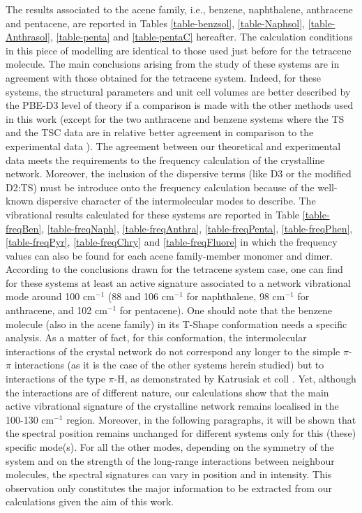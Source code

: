 The results associated to the acene family, i.e., benzene, naphthalene, anthracene and pentacene, are reported in Tables \ref{table-benzsol}, \ref{table-Naphsol}, \ref{table-Anthrasol}, \ref{table-penta} and \ref{table-pentaC} hereafter. The calculation conditions in this piece of modelling are identical to those used just before for the tetracene molecule. The main conclusions arising from the study of these systems are in agreement with those obtained for the tetracene system. Indeed, for these systems, the structural parameters and unit cell volumes are better described by the PBE-D3 level of theory if a comparison is made with the other methods used in this work (except for the two anthracene and benzene systems where the TS and the TSC data are in relative better agreement in comparison to the experimental data \cite{buvcko2013tkatchenko}). The agreement between our theoretical and experimental data meets the requirements to the frequency calculation of the crystalline network. Moreover, the inclusion of the dispersive terms (like D3 or the modified D2:TS) must be introduce onto the frequency calculation because of the well-known dispersive character of the intermolecular modes to describe. The vibrational results calculated for these systems are reported in Table \ref{table-freqBen}, \ref{table-freqNaph}, \ref{table-freqAnthra}, \ref{table-freqPenta}, \ref{table-freqPhen}, \ref{table-freqPyr}, \ref{table-freqChry} and \ref{table-freqFluore} in which the frequency values can also be found for each acene family-member monomer and dimer. According to the conclusions drawn for the tetracene system case, one can find for these systems at least an active signature associated to a network vibrational mode around 100 cm$^{-1}$ (88 and 106 cm$^{-1}$ for naphthalene, 98 cm$^{-1}$ for anthracene, and 102 cm$^{-1}$ for pentacene). One should note that the benzene molecule (also in the acene family) in its T-Shape conformation needs a specific analysis. As a matter of fact, for this conformation, the intermolecular interactions of the crystal network do not correspond any longer to the simple $\pi$-$\pi$ interactions (as it is the case of the other systems herein studied) but to interactions of the type $\pi$-H, as demonstrated by Katrusiak et coll \cite{katrusiak2010association}. Yet, although the interactions are of different nature, our calculations show that the main active vibrational signature of the crystalline network remains localised in the 100-130 cm$^{-1}$ region. Moreover, in the following paragraphs, it will be shown that the spectral position remains unchanged for different systems only for this (these) specific mode(s). For all the other modes, depending on the symmetry of the system and on the strength of the long-range interactions between neighbour molecules, the spectral signatures can vary in position and in intensity. This observation only constitutes the major information to be extracted from our calculations given the aim of this work.	
 	
